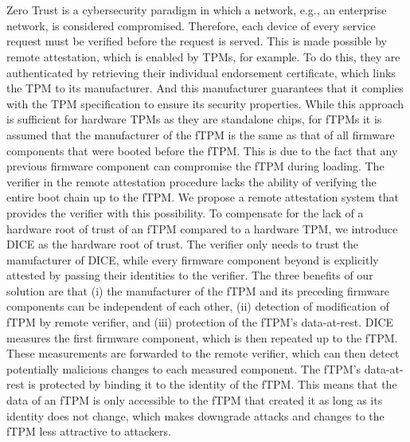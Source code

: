 \chapter{\abstractname}

Zero Trust is a cybersecurity paradigm in which a network, e.g., an enterprise network, is considered compromised.
Therefore, each device of every service request must be verified before the request is served.
This is made possible by remote attestation, which is enabled by \acp{TPM}, for example.
To do this, they are authenticated by retrieving their individual endorsement certificate, which links the \ac{TPM} to its manufacturer.
And this manufacturer guarantees that it complies with the \ac{TPM} specification to ensure its security properties.
While this approach is sufficient for hardware TPMs as they are standalone chips, for \acp{fTPM} it is assumed that the manufacturer of the \ac{fTPM} is the same as that of all firmware components that were booted before the \ac{fTPM}\@.
This is due to the fact that any previous firmware component can compromise the \ac{fTPM} during loading.
The verifier in the remote attestation procedure lacks the ability of verifying the entire boot chain up to the \ac{fTPM}\@.
We propose a remote attestation system that provides the verifier with this possibility.
To compensate for the lack of a hardware root of trust of an \ac{fTPM} compared to a hardware TPM, we introduce \ac{DICE} as the hardware root of trust.
The verifier only needs to trust the manufacturer of \ac{DICE}, while every firmware component beyond is explicitly attested by passing their identities to the verifier.
The three benefits of our solution are that (i) the manufacturer of the \ac{fTPM} and its preceding firmware components can be independent of each other, (ii) detection of modification of \ac{fTPM} by remote verifier, and (iii) protection of the \ac{fTPM}'s data-at-rest.
\ac{DICE} measures the first firmware component, which is then repeated up to the \ac{fTPM}\@.
These measurements are forwarded to the remote verifier, which can then detect potentially malicious changes to each measured component.
The \ac{fTPM}'s data-at-rest is protected by binding it to the identity of the \ac{fTPM}\@.
This means that the data of an \ac{fTPM} is only accessible to the \ac{fTPM} that created it as long as its identity does not change, which makes downgrade attacks and changes to the \ac{fTPM} less attractive to attackers.
